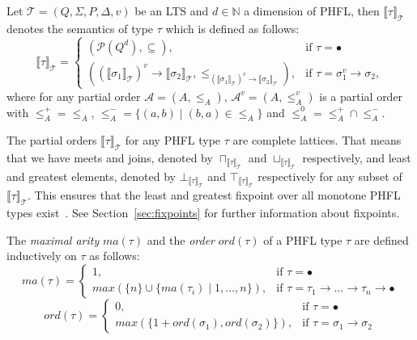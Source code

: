 \begin{definition}
    Let $\mathcal{T} = (Q, \Sigma, P, \Delta, v)$ be an LTS and $d \in \mathbb{N}$ a dimension of PHFL,
    then $\llbracket\tau\rrbracket_\mathcal{T}$ denotes the
    semantics
    of type $\tau$ which is defined as follows:
        \[\llbracket\tau\rrbracket_\mathcal{T}=
        \begin{cases}
            (\mathcal{P}(Q^d), \subseteq),  & \text{if }\tau = \bullet\\
            ((\llbracket\sigma_1\rrbracket_\mathcal{T})^v \rightarrow \llbracket\sigma_2\rrbracket_\mathcal{T}, \leq_{
            (\llbracket\sigma_1\rrbracket_\mathcal{T})^v \rightarrow \llbracket\sigma_2\rrbracket_\mathcal{T}}), &
            \text{if }\tau = \sigma_1^v\rightarrow \sigma_2,
        \end{cases}\]
    where for any partial order $\mathcal{A} = (A, \leq_A)$, $\mathcal{A}^v = (A, \leq_A^v)$ is a partial order
    with $\leq_A^+ = \leq_A$, $\leq_A^- = \{(a, b) \mid (b, a) \in \leq_A\}$ and $\leq_A^0 = \leq_A^+ \cap \leq_A^-$.
\end{definition}

The partial orders $\llbracket\tau\rrbracket_\mathcal{T}$ for any PHFL type $\tau$ are complete lattices. That means that we
have meets and joins, denoted by $\sqcap_{\llbracket\tau\rrbracket_\mathcal{T}}$ and
$\sqcup_{\llbracket\tau\rrbracket_\mathcal{T}}$ respectively, and least and greatest elements, denoted by
$\bot_{\llbracket\tau\rrbracket_\mathcal{T}}$ and $\top_{\llbracket\tau\rrbracket_\mathcal{T}}$ respectively for any subset of
$\llbracket\tau\rrbracket_\mathcal{T}$. This ensures that the least and greatest fixpoint over all monotone PHFL types
exist~\cite{tarski1955lattice}. See Section~\ref{sec:fixpoints} for further information about fixpoints.

\begin{definition}
    The \emph{maximal arity} $ma(\tau)$ and the \emph{order} $ord(\tau)$ of a PHFL type $\tau$ are defined
    inductively on
    $\tau$ as follows:
\[ma(\tau)=
\begin{cases}
    1, & \text{if }\tau = \bullet\\
    max(\{n\} \cup \{ma(\tau_i)\mid1,\dots,n\}), &
    \text{if }\tau = \tau_1\rightarrow\dots\rightarrow\tau_n\rightarrow\bullet
\end{cases}\]
\[ord(\tau)=
\begin{cases}
    0, & \text{if }\tau = \bullet\\
    max(\{1 + ord(\sigma_1), ord(\sigma_2)\}), & \text{if }\tau = \sigma_1 \rightarrow \sigma_2
\end{cases}\]
\end{definition}

